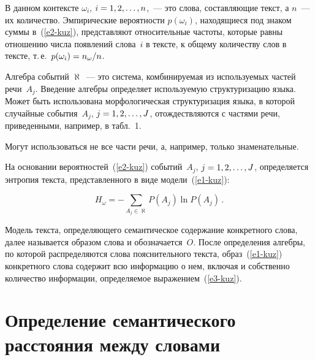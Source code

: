 \begin{multicols}{2}
     В данном контексте $\omega_i$, $i\hm = 1, 2, \ldots , n$,~--- это слова, 
составляющие текст, а $n$~--- их количество. Эмпирические вероятности 
$p(\omega_i)$, находящиеся под знаком суммы в~(\ref{e2-kuz}), представляют 
относительные частоты, которые равны отношению числа появлений слова~$i$ 
в тексте, к общему количеству слов в тексте, т.\,е.\ $p(\omega_i) \hm= 
n_\omega/n$. 
     
     Алгебра событий $\aleph$~--- это сис\-те\-ма, комбинируемая из 
используемых частей речи~$A_j$. Введение алгебры определяет используемую 
структуризацию языка. Может быть использована морфологическая 
структуризация языка, в которой случайные события~$A_j$, $j \hm= 1, 2, \ldots , 
J$, отождествляются с частями речи, приведенными, например, в табл.~1. 
     


     
     Могут использоваться не все части речи, а, например, только 
знаменательные. 
     
     На основании вероятностей~(\ref{e2-kuz}) событий~$A_j$, $j \hm= 1, 2, 
\ldots , J$, определяется энтропия текста, представленного в виде 
модели~(\ref{e1-kuz}):

\vspace*{4pt}

\noindent
     \begin{equation}
     H_\omega=-\sum\limits_{A_j\in \aleph} P(A_j) \ln P(A_j)\,.
     \label{e3-kuz}
     \end{equation}
     
     \vspace*{-2pt}
     
     Модель текста, определяющего семантическое содержание конкретного 
слова, далее называется образом слова и обозначается~$O$. После определения 
алгебры, по которой распределяются слова пояснительного текста, 
образ~(\ref{e1-kuz}) конкретного слова содержит всю информацию о нем, 
включая и собственно количество информации, определяемое 
выражением~(\ref{e3-kuz}). 

\vspace*{-6pt}
     
     
\section{Определение семантического расстояния между словами}
     

\end{multicols}
